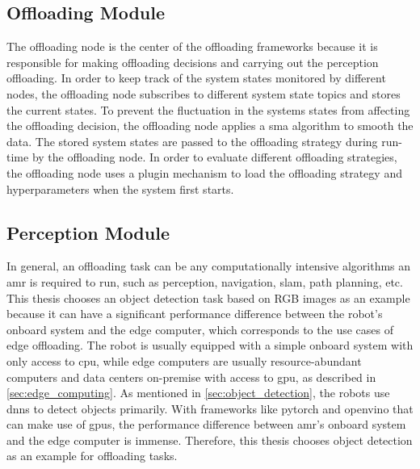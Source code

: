 \subsection{Offloading Module}


The offloading node is the center of the offloading frameworks because it is responsible for making offloading decisions and carrying out the perception offloading. In order to keep track of the system states monitored by different nodes, the offloading node subscribes to different system state topics and stores the current states. To prevent the fluctuation in the systems states from affecting the offloading decision, the offloading node applies a \gls{sma} algorithm to smooth the data. The stored system states are passed to the offloading strategy during run-time by the offloading node. In order to evaluate different offloading strategies, the offloading node uses a plugin mechanism to load the offloading strategy and hyperparameters when the system first starts. 


\subsection{Perception Module}


In general, an offloading task can be any computationally intensive algorithms an \gls{amr} is required to run, such as perception, navigation, \gls{slam}, path planning, etc. This thesis chooses an object detection task based on RGB images as an example because it can have a significant performance difference between the robot's onboard system and the edge computer, which corresponds to the use cases of edge offloading. The robot is usually equipped with a simple onboard system with only access to \gls{cpu}, while edge computers are usually resource-abundant computers and data centers on-premise with access to \gls{gpu}, as described in \cref{sec:edge_computing}. As mentioned in \cref{sec:object_detection}, the robots use \glspl{dnn} to detect objects primarily. With frameworks like \gls{pytorch} and \gls{openvino} that can make use of \glspl{gpu}, the performance difference between \gls{amr}'s onboard system and the edge computer is immense. Therefore, this thesis chooses object detection as an example for offloading tasks. 

